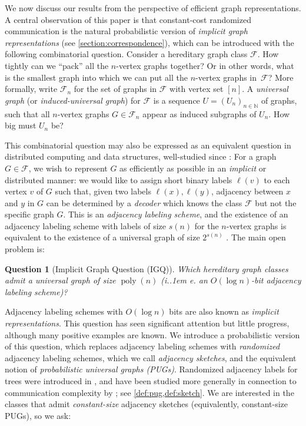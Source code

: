 \documentclass{article}
\makeatletter
\newtheorem{question}[theorem]{Question}
\DeclareMathOperator{\poly}{poly}
\newcommand{\cF}{\ensuremath{\mathcal{F}}}
\newcommand{\bN}{\ensuremath{\mathbb{N}}}
\newcommand*\ie{i.\kern.1em e.\@\xspace} %
\makeatother
\begin{document}
We now discuss our results from the perspective of efficient graph representations.  A central
observation of this paper is that constant-cost randomized communication is the natural
probabilistic version of \emph{implicit graph representations} (see \cref{section:correspondence}),
which can be introduced with the following combinatorial question. Consider a hereditary graph class
$\cF$. How tightly can we ``pack'' all the $n$-vertex graphs together? Or in other words, what is
the smallest graph into which we can put all the $n$-vertex graphs in~$\cF$?  More formally, write
$\cF_n$ for the set of graphs in $\cF$ with vertex set $[n]$.  A \emph{universal graph} (or
\emph{induced-universal graph}) for $\cF$ is a sequence $U = (U_n)_{n \in \bN}$ of graphs, such that
all $n$-vertex graphs $G \in \cF_n$ appear as induced subgraphs of $U_n$. How big must $U_n$ be? 

This combinatorial question may also be expressed as an equivalent question in
distributed computing and data structures, well-studied since \cite{Mul89,KNR92}: For a graph $G \in
\cF$, we wish to represent $G$ as efficiently as possible in an \emph{implicit} or distributed
manner: we would like to assign short binary labels $\ell(v)$ to each vertex $v$ of $G$ such that,
given two labels $\ell(x), \ell(y)$, adjacency between $x$ and $y$ in $G$ can be determined by a
\emph{decoder} which knows the class $\cF$ but not the specific graph $G$. This is an
\emph{adjacency labeling scheme}, and the existence of an adjacency labeling scheme with labels of
size $s(n)$ for the $n$-vertex graphs is equivalent to the existence of a universal graph of size
$2^{s(n)}$ \cite{KNR92}. The main open problem is:

\begin{question}[Implicit Graph Question (IGQ)]
Which hereditary graph classes admit a universal graph of size $\poly(n)$ (\ie an $O(\log n)$-bit
adjacency labeling scheme)? 
\end{question}

Adjacency labeling schemes with $O(\log n)$ bits are also known as \emph{implicit representations}.
This question has seen significant attention but little progress, although many positive examples
are known.  We introduce a probabilistic version of this question, which replaces adjacency labeling
schemes with \emph{randomized} adjacency labeling schemes, which we call \emph{adjacency sketches},
and the equivalent notion of \emph{probabilistic universal graphs (PUGs)}. Randomized adjacency
labels for trees were introduced in \cite{FK09}, and have been studied more generally in connection
to communication complexity by \cite{Har20}; see \cref{def:pug,def:sketch}. We are interested in the
classes that admit \emph{constant-size} adjacency sketches (equivalently, constant-size PUGs), so we
ask:
\end{document}
